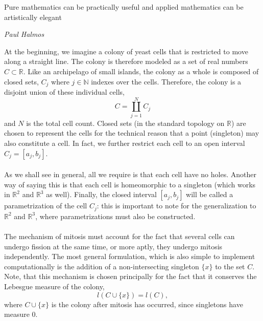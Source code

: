 \introduction
\epigraph{Pure mathematics can be practically useful and applied mathematics can be artistically elegant}{\textit{Paul Halmos}}
At the beginning, we imagine a colony of yeast cells that is restricted to move along a straight line. The colony is therefore modeled as a set of real numbers $C \subset \mathbb{R}$. Like an archipelago of small islands, the colony as a whole is composed of closed sets, $C_j$ where $j \in \mathbb{N}$ indexes over the cells. Therefore, the colony is a disjoint union of these individual cells,
\begin{equation*}
    C = \coprod_{j=1}^N C_j
\end{equation*}
and $N$ is the total cell count. Closed sets (in the standard topology on $\mathbb{R}$) are chosen to represent the cells for the technical reason that a point (singleton) may also constitute a cell. In fact, we further restrict each cell to an open interval $C_j = [a_j, b_j]$.
\\
\\
As we shall see in general, all we require is that each cell have no holes. Another way of saying this is that each cell is homeomorphic to a singleton (which works in $\mathbb{R}^2$ and $\mathbb{R}^3$ as well). Finally, the closed interval $[a_j,b_j]$ will be called a parametrization of the cell $C_j$: this is important to note for the generalization to $\mathbb{R}^2$ and $\mathbb{R}^3$, where parametrizations must also be constructed.
\\
\\
The mechanism of mitosis must account for the fact that several cells can undergo fission at the same time, or more aptly, they undergo mitosis independently. The most general formulation, which is also simple to implement computationally is the addition of a non-intersecting singleton $\{x  \}$ to the set $C$. Note, that this mechanism is chosen principally for the fact that it conserves the Lebesgue measure of the colony,
\begin{equation*}
    l(C \cup \{x\} ) = l(C),
\end{equation*}
where $C \cup \{x\} $ is the colony after mitosis has occurred, since singletons have measure $0$.